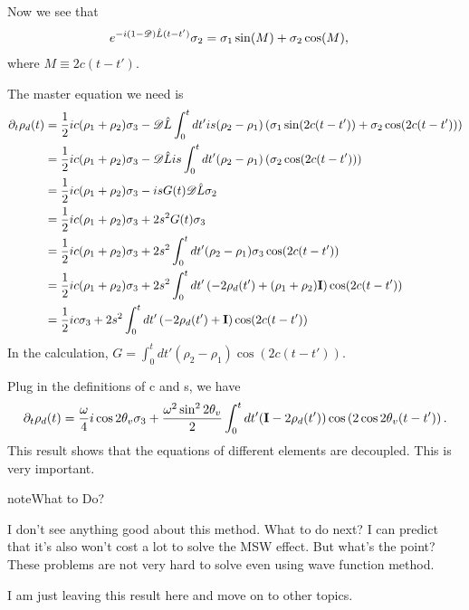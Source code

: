 \documentclass[letterpaper,12pt,english]{sphinxmanual}
\begin{document}
Now we see that
\begin{gather}
\begin{split}e^{-i(1-\mathscr D)\hat L (t-t')} \sigma_2 &= \sigma_1 \sin(M) + \sigma_2 \cos(M),\end{split}\notag
\end{gather}
where \(M\equiv 2 c (t-t')\).

The master equation we need is
\begin{gather}
\begin{split}\partial_t \rho_d(t) &= \frac{1}{2}ic(\rho_1+\rho_2)\sigma_3 - \mathscr D \hat L \int_0^t  dt' i s (\rho_2-\rho_1) \left(\sigma_1 \sin(2c(t-t')) + \sigma_2 \cos(2c(t-t'))\right) \\
& = \frac{1}{2}ic(\rho_1+\rho_2)\sigma_3 - \mathscr D \hat L  i s \int_0^t  dt' (\rho_2-\rho_1) \left(\sigma_2 \cos(2c(t-t'))\right)   \\
& = \frac{1}{2}ic(\rho_1+\rho_2)\sigma_3 -  i s G(t) \mathscr D \hat L  \sigma_2   \\
& = \frac{1}{2}ic(\rho_1+\rho_2)\sigma_3 + 2 s^2 G(t) \sigma_3 \\
& = \frac{1}{2}ic(\rho_1+\rho_2)\sigma_3 + 2 s^2 \int_0^t dt' (\rho_2-\rho_1)  \sigma_3 \cos(2c(t-t')) \\
& = \frac{1}{2}ic(\rho_1+\rho_2)\sigma_3 + 2 s^2 \int_0^t dt' \left( -2\rho_d(t') + (\rho_1+\rho_2) \mathbf I \right) \cos(2c(t-t')) \\
& = \frac{1}{2}ic\sigma_3 + 2 s^2 \int_0^t dt' \left( -2\rho_d(t') + \mathbf I \right) \cos(2c(t-t'))\end{split}\notag
\end{gather}
In the calculation, \(G=\int_0^t dt'(\rho_2-\rho_1)\cos(2c(t-t'))\).

Plug in the definitions of c and s, we have
\begin{gather}
\begin{split}\partial_t\rho_d(t) = \frac{\omega}{4} i \cos 2\theta_v \sigma_3 +  \frac{\omega^2 \sin^2 2\theta_v }{2} \int_0^t dt' (\mathbf I - 2 \rho_d(t'))\cos \left( 2 \cos 2\theta_v (t - t') \right).\end{split}\notag
\end{gather}
This result shows that the equations of different elements are decoupled. This is very important.

\begin{notice}{note}{What to Do?}

I don't see anything good about this method. What to do next? I can predict that it's also won't cost a lot to solve the MSW effect. But what's the point? These problems are not very hard to solve even using wave function method.

I am just leaving this result here and move on to other topics.
\end{notice}
\end{document}
